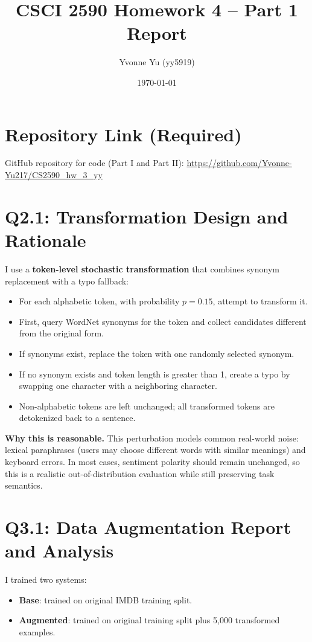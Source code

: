 \documentclass[11pt]{article}
\title{CSCI 2590 Homework 4 -- Part 1 Report}
\author{Yvonne Yu (yy5919)}
\date{\today}
\begin{document}
\maketitle

\section*{Repository Link (Required)}
GitHub repository for code (Part I and Part II):
\href{https://github.com/Yvonne-Yu217/CS2590_hw_3_yy}{https://github.com/Yvonne-Yu217/CS2590\_hw\_3\_yy}

\section*{Q2.1: Transformation Design and Rationale}
I use a \textbf{token-level stochastic transformation} that combines synonym replacement with a typo fallback:
\begin{itemize}
	\item For each alphabetic token, with probability $p = 0.15$, attempt to transform it.
	\item First, query WordNet synonyms for the token and collect candidates different from the original form.
	\item If synonyms exist, replace the token with one randomly selected synonym.
	\item If no synonym exists and token length is greater than 1, create a typo by swapping one character with a neighboring character.
	\item Non-alphabetic tokens are left unchanged; all transformed tokens are detokenized back to a sentence.
\end{itemize}

\textbf{Why this is reasonable.}
This perturbation models common real-world noise: lexical paraphrases (users may choose different words with similar meanings) and keyboard errors. In most cases, sentiment polarity should remain unchanged, so this is a realistic out-of-distribution evaluation while still preserving task semantics.

\section*{Q3.1: Data Augmentation Report and Analysis}
I trained two systems:
\begin{itemize}
	\item \textbf{Base}: trained on original IMDB training split.
	\item \textbf{Augmented}: trained on original training split plus 5,000 transformed examples.
\end{itemize}
\end{document}

